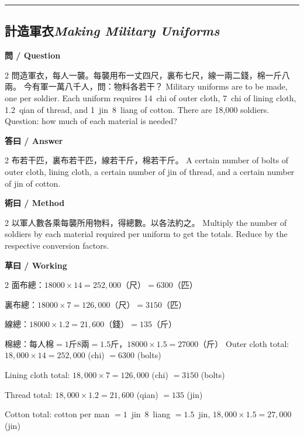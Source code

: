 \documentclass[11pt,a4paper]{article}
\newcommand{\bilingualsubsection}[2]{\subsection{#1\quad\textit{#2}}}
\newcommand{\longline}{\noindent\rule{\textwidth}{0.4pt}}
\begin{document}
\vspace{0.5em}
\longline

\bilingualsubsection{計造軍衣}{Making Military Uniforms}

\vspace{0.4em}
\noindent\textbf{\textcolor{chinesecolor}{問} / \textcolor{englishcolor}{Question}}
\vspace{0.3em}
\begin{paracol}{2}
問造軍衣，每人一襲。每襲用布一丈四尺，裏布七尺，線一兩二錢，棉一斤八兩。
今有軍一萬八千人，問：物料各若干？
\switchcolumn
Military uniforms are to be made, one per soldier. Each uniform requires
14~chi of outer cloth, 7~chi of lining cloth, 1.2~qian of thread, and
1~jin~8~liang of cotton. There are 18{,}000 soldiers. Question: how much of
each material is needed?
\end{paracol}

\vspace{0.4em}
\noindent\textbf{\textcolor{chinesecolor}{答曰} / \textcolor{englishcolor}{Answer}}
\vspace{0.2em}
\begin{paracol}{2}
布若干匹，裏布若干匹，線若干斤，棉若干斤。
\switchcolumn
A certain number of bolts of outer cloth, lining cloth, a certain number of
jin of thread, and a certain number of jin of cotton.
\end{paracol}

\vspace{0.4em}
\noindent\textbf{\textcolor{chinesecolor}{術曰} / \textcolor{englishcolor}{Method}}
\vspace{0.2em}
\begin{paracol}{2}
以軍人數各乘每襲所用物料，得總數。以各法約之。
\switchcolumn
Multiply the number of soldiers by each material required per uniform to get
the totals. Reduce by the respective conversion factors.
\end{paracol}

\vspace{0.4em}
\noindent\textbf{\textcolor{chinesecolor}{草曰} / \textcolor{englishcolor}{Working}}
\vspace{0.2em}
\begin{paracol}{2}
面布總：$18000 \times 14 = 252{,}000$（尺）$= 6300$（匹）

裏布總：$18000 \times 7 = 126{,}000$（尺）$= 3150$（匹）

線總：$18000 \times 1.2 = 21{,}600$（錢）$= 135$（斤）

棉總：每人棉$= 1$斤$8$兩$= 1.5$斤，$18000 \times 1.5 = 27000$（斤）
\switchcolumn
Outer cloth total: $18{,}000 \times 14 = 252{,}000$ (chi) $= 6300$ (bolts)

Lining cloth total: $18{,}000 \times 7 = 126{,}000$ (chi) $= 3150$ (bolts)

Thread total: $18{,}000 \times 1.2 = 21{,}600$ (qian) $= 135$ (jin)

Cotton total: cotton per man $= 1$~jin~8~liang $= 1.5$~jin,
$18{,}000 \times 1.5 = 27{,}000$ (jin)
\end{paracol}
\end{document}
